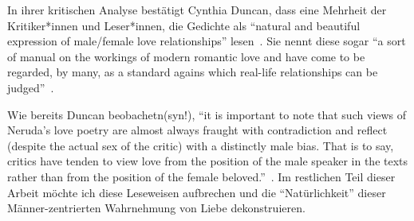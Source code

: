 In ihrer kritischen Analyse bestätigt Cynthia Duncan, dass eine Mehrheit der Kritiker*innen und Leser*innen, die Gedichte als ``natural and beautiful expression of male/female love relationships'' lesen~\cite{Duncan1992}.
Sie nennt diese sogar %
``a sort of manual on the workings of modern romantic love and have come to be regarded, by many, as a standard agains which real-life relationships can be judged''~\cite{Duncan1992}.

\begin{comment}
``Others who have treated Neruda's love poetry from the male perspective include: Aguirre, Alazraki, Alonso, Durán, Pérez, and Pimentel. While I do not disparage the work of these or other critics of Neruda's poetry, I feel that they have contributed to the notion that the texts are "natural" reflections of male/female relationships and that the position of the woman in the texts is an enviable one. To my knowledge, the only critics to date who have acknowledged that the asence of a feminine perspective in Neruda's poetry is problematic are John Felstiner and Marjorie Agosin.''

\end{comment}

Wie bereits Duncan beobachetn(syn!), ``it is important to note that such views of Neruda's love poetry are almost always fraught with contradiction and reflect (despite the actual sex of the critic) with a distinctly male bias.
That is to say, critics have tenden to view love from the position of the male speaker in the texts rather than from the position of the female beloved.''~\cite{Duncan1992}.
Im restlichen Teil dieser Arbeit möchte ich diese Leseweisen aufbrechen und die ``Natürlichkeit'' dieser Männer-zentrierten Wahrnehmung von Liebe dekonstruieren.

\begin{comment}
``There is no doubt that Neruda is a gifted poet; whether he is guilty of sexism as a writer is not a point I wish to debate here.
But, I do take issue with the critical readings of Neruda which have drawn attention to the repression, subjugation, and silencing of women in his poetry only to dismiss these factors as natural conditions which are in and of themselves praiseworthy.''
"Sexims does not reside so much in the actual images as in the readingof those images: why is the passive, silenced woman seen in a position of power when her very existence depends on her male lover? Why is she viewed as man's equal when she is portrayed in the texts as his subordinate? Why do critics speak about a dialogue between the lovers when the woman's part is never voiced?
In The guise of honoring womanhood and its uniqueness, these readings of Neruda's love poertry conceal textual contradictions that are symptomatic of the way women are repressed in patriarchal culture."
\end{comment}


